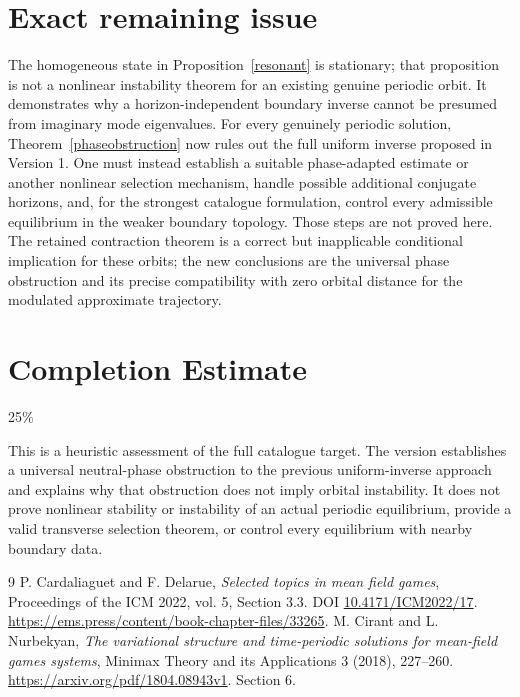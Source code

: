 \documentclass[11pt]{article}
\begin{document}
\section{Exact remaining issue}
The homogeneous state in Proposition~\ref{resonant} is stationary;
that proposition is not a nonlinear instability theorem for an existing
genuine periodic orbit. It demonstrates why a horizon-independent
boundary inverse cannot be presumed from imaginary mode eigenvalues.
For every genuinely periodic solution, Theorem~\ref{phaseobstruction}
now rules out the full uniform inverse proposed in Version 1. One must
instead establish a suitable phase-adapted estimate or another nonlinear
selection mechanism, handle possible additional conjugate horizons, and,
for the strongest catalogue formulation, control every admissible
equilibrium in the weaker boundary topology. Those steps are not proved
here. The retained contraction theorem is a correct but inapplicable
conditional implication for these orbits; the new conclusions are the
universal phase obstruction and its precise compatibility with zero
orbital distance for the modulated approximate trajectory.

\section{Completion Estimate}
25\%

This is a heuristic assessment of the full catalogue target. The version establishes a universal neutral-phase obstruction to the previous uniform-inverse approach and explains why that obstruction does not imply orbital instability. It does not prove nonlinear stability or instability of an actual periodic equilibrium, provide a valid transverse selection theorem, or control every equilibrium with nearby boundary data.

\begin{thebibliography}{9}
 P. Cardaliaguet and F. Delarue,
\emph{Selected topics in mean field games}, Proceedings of the ICM 2022,
vol. 5, Section 3.3. DOI \href{https://doi.org/10.4171/ICM2022/17}{10.4171/ICM2022/17}.
\url{https://ems.press/content/book-chapter-files/33265}.
 M. Cirant and L. Nurbekyan,
\emph{The variational structure and time-periodic solutions for mean-field games systems},
Minimax Theory and its Applications 3 (2018), 227--260.
\url{https://arxiv.org/pdf/1804.08943v1}. Section 6.
\end{thebibliography}
\end{document}

